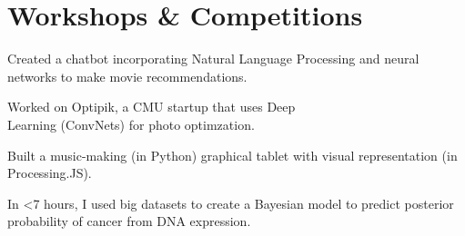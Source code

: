 \documentclass[]{deedy-resume-openfont}
\begin{document}
\section{\color{Blue} Workshops \& Competitions}
\begin{minipage}{0.5\textwidth} 



Created a chatbot incorporating Natural Language Processing and neural networks to make movie recommendations.
\sectionsep

Worked on Optipik, a CMU startup that uses Deep\\ Learning (ConvNets) for photo optimzation.
\sectionsep




\end{minipage}%
\begin{minipage}{0.5\textwidth}

Built a music-making (in Python) graphical tablet with visual representation (in Processing.JS).
\sectionsep

In <7 hours, I used big datasets to create a Bayesian model to predict posterior probability of cancer from DNA expression.
\sectionsep


\end{minipage}



\end{document}
